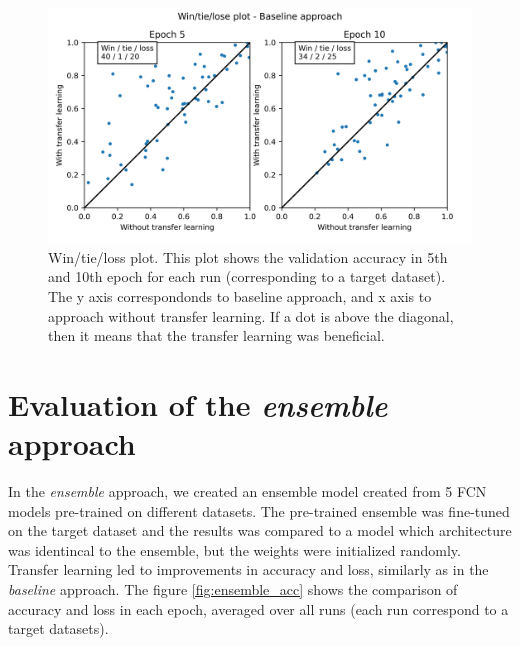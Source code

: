 \documentclass[a4paper,11pt,twoside]{report}
\theoremstyle{definition}
\begin{document}
\FloatBarrier
\begin{figure}[h!t]
\centering
\includegraphics[width=17 cm]{imgs/baseline/win_tie_lose_epoch.png}
\caption{Win/tie/loss plot. This plot shows the validation accuracy in 5th and 10th epoch for each run (corresponding to a target dataset). The y axis correspondonds to baseline approach, and x axis to approach without transfer learning. If a dot is above the diagonal, then it means that the transfer learning was beneficial.}
\label{fig:win_tie_loss_baseline}
\end{figure}

\FloatBarrier
\section{Evaluation of the \textit{ensemble} approach}
In the \textit{ensemble} approach, we created an ensemble model created from 5 FCN models pre-trained on different datasets. The pre-trained ensemble was fine-tuned on the target dataset and the results was compared to a model which architecture was identincal to the ensemble, but the weights were initialized randomly. Transfer learning led to improvements in accuracy and loss, similarly as in the \textit{baseline} approach. The figure \ref{fig:ensemble_acc} shows the comparison of accuracy and loss in each epoch, averaged over all runs (each run correspond to a target datasets).

\FloatBarrier
\end{document}
